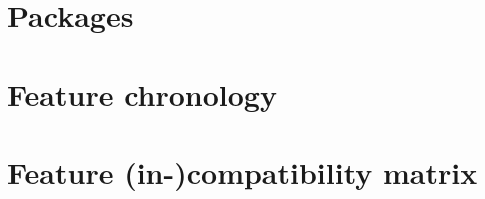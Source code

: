 \documentclass[letterpaper,hyper]{HDF}
\begin{document}
\appendix

\chapter{Packages}\label{app:conventions}


\chapter{Feature chronology}\label{app:chronology}


\chapter{Feature (in-)compatibility matrix}\label{app:feat-compat}




%

\printbibliography
\end{document}
